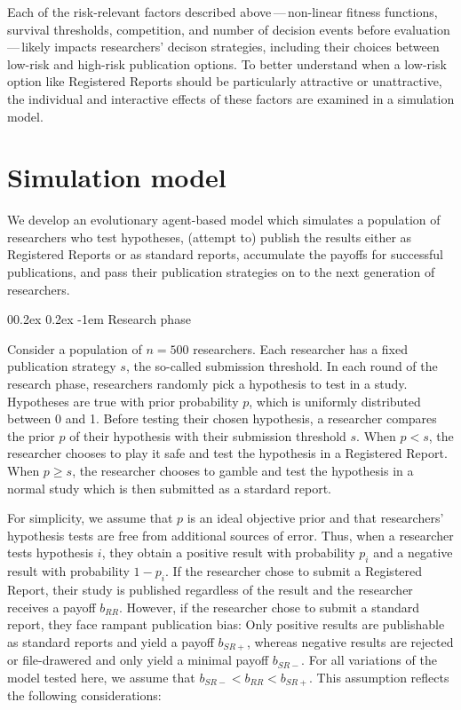 \documentclass[british,,doc,mask,floatsintext]{apa6}
\makeatletter
\renewcommand{\paragraph}{\@startsection{paragraph}{4}{\parindent}%
  {0\baselineskip \@plus 0.2ex \@minus 0.2ex}%
  {-1em}%
  {\normalfont\normalsize\bfseries\itshape\typesectitle}}
\makeatother
\begin{document}
Each of the risk-relevant factors described above\(\,\)---\(\,\)non-linear fitness functions, survival thresholds, competition, and number of decision events before evaluation\(\,\)---\(\,\)likely impacts researchers' decison strategies, including their choices between low-risk and high-risk publication options.
To better understand when a low-risk option like Registered Reports should be particularly attractive or unattractive, the individual and interactive effects of these factors are examined in a simulation model.

\hypertarget{simulation-model}{%
\section{Simulation model}\label{simulation-model}}

We develop an evolutionary agent-based model which simulates a population of researchers who test hypotheses, (attempt to) publish the results either as Registered Reports or as standard reports, accumulate the payoffs for successful publications, and pass their publication strategies on to the next generation of researchers.

\hypertarget{research-phase}{%
\paragraph{Research phase}\label{research-phase}}

Consider a population of \(n = 500\) researchers.
Each researcher has a fixed publication strategy \(s\), the so-called submission threshold.
In each round of the research phase, researchers randomly pick a hypothesis to test in a study.
Hypotheses are true with prior probability \(p\), which is uniformly distributed between 0 and 1.
Before testing their chosen hypothesis, a researcher compares the prior \(p\) of their hypothesis with their submission threshold \(s\).
When \(p < s\), the researcher chooses to play it safe and test the hypothesis in a Registered Report.
When \(p \geq s\), the researcher chooses to gamble and test the hypothesis in a normal study which is then submitted as a stardard report.

For simplicity, we assume that \(p\) is an ideal objective prior and that researchers' hypothesis tests are free from additional sources of error.
Thus, when a researcher tests hypothesis \(i\), they obtain a positive result with probability \(p_i\) and a negative result with probability \(1-p_i\).
If the researcher chose to submit a Registered Report, their study is published regardless of the result and the researcher receives a payoff \(b_{RR}\).
However, if the researcher chose to submit a standard report, they face rampant publication bias:
Only positive results are publishable as standard reports and yield a payoff \(b_{SR+}\), whereas negative results are rejected or file-drawered and only yield a minimal payoff \(b_{SR-}\).
For all variations of the model tested here, we assume that \(b_{SR-} < b_{RR} < b_{SR+}\).
This assumption reflects the following considerations:
\end{document}
